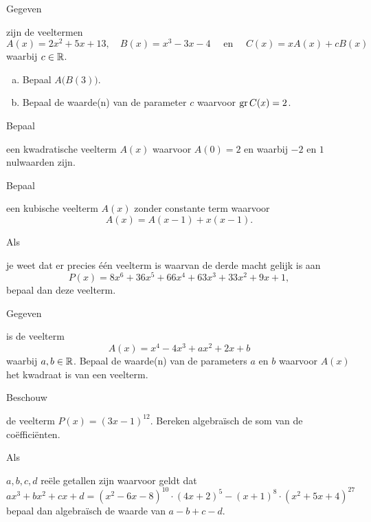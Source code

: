 \documentclass{ximera}
\begin{document}
\begin{exercise} 
\hypertarget{oef1.12}{Gegeven} zijn de veeltermen 
\[
A(x) = 2x^2 + 5x + 13, \quad B(x) =  x^3-3x-4  \quad \text{ en } \quad C(x) = xA(x) + cB(x)
\]
waarbij $c \in \mathbb{R}$.
\begin{enumerate}[(a)]
\item
Bepaal $A\bigl(B(3)\bigr)$.
\item
Bepaal de waarde(n) van de parameter $c$ waarvoor $\operatorname{gr} C(x) = 2$.
\end{enumerate}
\end{exercise} 

\begin{exercise} 
\hypertarget{oef1.13}{Bepaal} een kwadratische veelterm $A(x)$ waarvoor $A(0) = 2$ en waarbij $-2$ en $1$ nulwaarden zijn.
\end{exercise} 

\begin{exercise} 
\hypertarget{oef1.14}{Bepaal} een kubische veelterm $A(x)$ zonder constante term waarvoor
\[
A(x) = A(x-1) + x(x-1).
\]
\end{exercise} 

\begin{exercise} 
\hypertarget{oef1.15}{Als} je weet dat er precies \'e\'en veelterm is waarvan de derde macht gelijk is aan 
\[
P(x) = 8x^6 + 36x^5 + 66x^4 + 63x^3 + 33x^2 + 9x + 1,
\]
bepaal dan deze veelterm.
\end{exercise} 

\begin{exercise} 
\hypertarget{oef1.16}{Gegeven} is de veelterm
\[
A(x) = x^4 - 4x^3 + ax^2 + 2x + b
\]
waarbij $a,b \in \mathbb{R}$. Bepaal de waarde(n) van de parameters $a$ en $b$ waarvoor $A(x)$ het kwadraat is van een veelterm. 
\end{exercise} 

\begin{exercise} 
\hypertarget{oef1.17}{Beschouw} de veelterm $P(x) = (3x - 1)^{12}$. Bereken algebra\"isch de som van de co\"effici\"enten. 
\end{exercise} 

\begin{exercise} 
\hypertarget{oef1.18}{Als} $a,b,c,d$ re\"ele getallen zijn waarvoor geldt dat
\[
ax^3 + bx^2 + cx + d = (x^2-6x-8)^{10}\cdot(4x+2)^5 - (x+1)^8\cdot(x^2+5x+4)^{27}
\]
bepaal dan algebra\"isch de waarde van $a-b+c-d$.
\end{exercise} 
\end{document}
